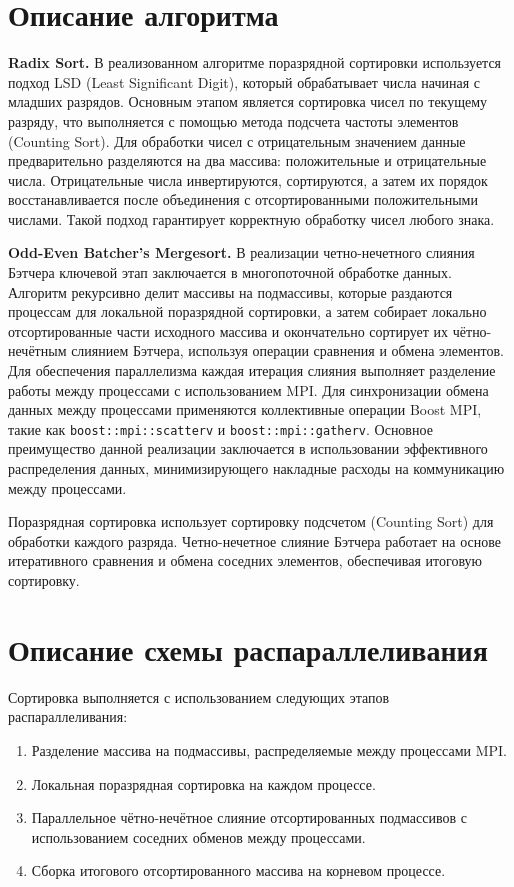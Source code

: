 ﻿\documentclass[a4paper,12pt]{article}
\begin{document}
\section*{Описание алгоритма}

\textbf{Radix Sort.} В реализованном алгоритме поразрядной сортировки используется подход LSD (Least Significant Digit), который обрабатывает числа начиная с младших разрядов. Основным этапом является сортировка чисел по текущему разряду, что выполняется с помощью метода подсчета частоты элементов (Counting Sort). Для обработки чисел с отрицательным значением данные предварительно разделяются на два массива: положительные и отрицательные числа. Отрицательные числа инвертируются, сортируются, а затем их порядок восстанавливается после объединения с отсортированными положительными числами. Такой подход гарантирует корректную обработку чисел любого знака.

\textbf{Odd-Even Batcher's Mergesort.} В реализации четно-нечетного слияния Бэтчера ключевой этап заключается в многопоточной обработке данных. Алгоритм рекурсивно делит массивы на подмассивы, которые раздаются процессам для локальной поразрядной сортировки, а затем собирает локально отсортированные части исходного массива и окончательно сортирует их чётно-нечётным слиянием Бэтчера, используя операции сравнения и обмена элементов. Для обеспечения параллелизма каждая итерация слияния выполняет разделение работы между процессами с использованием MPI. Для синхронизации обмена данных между процессами применяются коллективные операции Boost MPI, такие как \texttt{boost::mpi::scatterv} и \texttt{boost::mpi::gatherv}. Основное преимущество данной реализации заключается в использовании эффективного распределения данных, минимизирующего накладные расходы на коммуникацию между процессами.

Поразрядная сортировка использует сортировку подсчетом (Counting Sort) для обработки каждого разряда. Четно-нечетное слияние Бэтчера работает на основе итеративного сравнения и обмена соседних элементов, обеспечивая итоговую сортировку.

\section*{Описание схемы распараллеливания}
Сортировка выполняется с использованием следующих этапов распараллеливания:
\begin{enumerate}
    \item Разделение массива на подмассивы, распределяемые между процессами MPI.
    \item Локальная поразрядная сортировка на каждом процессе.
    \item Параллельное чётно-нечётное слияние отсортированных подмассивов с использованием соседних обменов между процессами.
    \item Сборка итогового отсортированного массива на корневом процессе.
\end{enumerate}
\end{document}
